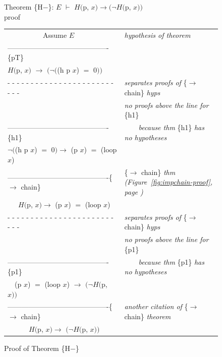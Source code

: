 \begin{figure}
Theorem \{H$-$\}: $E$ $\vdash$ $H($p, $x) \rightarrow(\neg H($p, $x))$~\\
proof
\begin{center}
\begin{tabular}{ll}
~~~~~~~~~~Assume $E$                                &\emph{hypothesis of theorem}\\
-------------------------------------------\{pT\}   &\\
$H($\textsf{p}, $x)$ $\rightarrow$ $(\neg($\textsf{(h p $x$)} $=$ 0$))$   &\\
 - - - - - - - - - - - - - - - - - - - - - - - - - -&\emph{separates proofs of} \{$\rightarrow$ chain\} \emph{hyps}\\
                                                    &\emph{no proofs above the line for} \{h1\}\\
-------------------------------------------\{h1\}   &~~~~\emph{because thm} \{h1\} \emph{has no hypotheses}\\
$\neg($\textsf{(h p $x$)} $=$ \textsf{0}$) \rightarrow$ \textsf{(p $x$)} $=$ \textsf{(loop $x$)}&\\
-------------------------------------------\{$\rightarrow$ chain\} &\{$\rightarrow$ chain\} \emph{thm (Figure~\ref{fig:impchain-proof}, page \pageref{fig:impchain-proof})}\\
~~~$H($\textsf{p}, $x) \rightarrow$ \textsf{(p $x$)} $=$ \textsf{(loop $x$)} &\\
 - - - - - - - - - - - - - - - - - - - - - - - - - -&\emph{separates proofs of} \{$\rightarrow$ chain\} \emph{hyps}\\
                                                    &\emph{no proofs above the line for} \{p1\}\\
-------------------------------------------\{p1\}   &~~~~\emph{because thm} \{p1\} \emph{has no hypotheses}\\
~~\textsf{(p $x$)} $=$ \textsf{(loop $x$)} $\rightarrow$ $(\neg H($\textsf{p}, $x))$ &\\
-------------------------------------------\{$\rightarrow$ chain\} &\emph{another citation of} \{$\rightarrow$ chain\} \emph{theorem}\\
~~~~~~$H($\textsf{p}, $x) \rightarrow$ $(\neg H($\textsf{p}, $x))$  &\\
\end{tabular}
\end{center}
\caption{Proof of Theorem \{H$-$\}}
\label{fig:hminus-thm-proof}
\end{figure}

